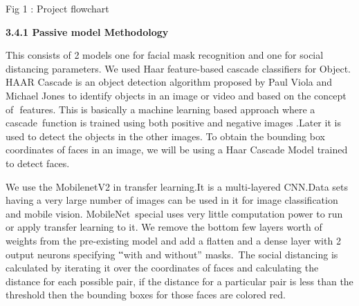 \documentclass[12pt]{article}
\begin{document}

\setlength{\parskip}{0.0pt}

\begin{Center}
{\fontsize{14pt}{16.8pt}\selectfont Fig 1 : Project flowchart}
\end{Center}

\vspace{\baselineskip}
\setlength{\parskip}{9.96pt}
\begin{justify}
{\fontsize{14pt}{16.8pt}\selectfont \textbf{3.4.1 Passive model Methodology}}
\end{justify}
\vspace{\baselineskip}

\begin{justify}
This consists of 2 models one for facial mask recognition and one for social distancing parameters. We used Haar feature-based cascade classifiers for Object. \textcolor[HTML]{202124}{HAAR Cascade} is an object detection \textcolor[HTML]{202124}{algorithm} proposed by Paul Viola and Michael Jones to identify objects in an image or video and based on the concept of ​​ features. This is basically a machine learning based approach where a \textcolor[HTML]{202124}{cascade}\ function is trained using both positive and negative images  .Later it is used to detect the objects in the other images. To obtain the bounding box coordinates of faces in an image, we will be using a Haar Cascade Model trained to detect faces. 
\end{justify}
\begin{justify}
We use the MobilenetV2 in transfer learning.It is a multi-layered CNN.Data sets having a very large number of images can be used in it for image classification and mobile vision. \textcolor[HTML]{202124}{MobileNet}\ special uses very little computation power to run or apply transfer learning to it. We remove the bottom few layers worth of weights from the pre-existing model and add a flatten and a dense layer with 2 output neurons specifying $``$with and without'' masks. The social distancing is calculated by iterating it  over the coordinates of faces and calculating the distance for each possible pair, if the distance for a particular pair is less than the threshold then the bounding boxes for those faces are colored red. 
\end{justify}
\setlength{\parskip}{0.0pt}
\end{document}
